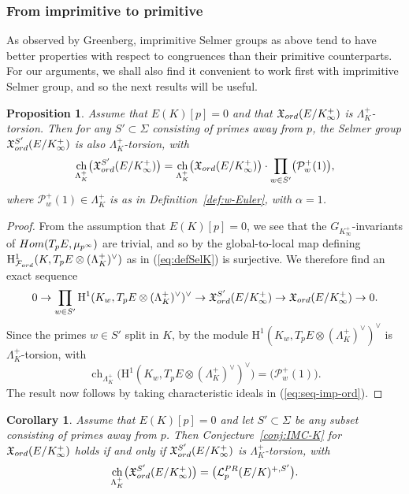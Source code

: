 \documentclass[a4paper,10pt]{amsart}
\numberwithin{equation}{section}
\numberwithin{equation}{section}
\theoremstyle{plain}
\theoremstyle{definition}
\theoremstyle{definition}
\theoremstyle{plain}
\newtheorem{prop}[thm]{Proposition}
\theoremstyle{plain}
\theoremstyle{plain}
\newtheorem{cor}[thm]{Corollary}
\theoremstyle{plain}
\newcommand{\X}{\mathfrak{X}}
\DeclareMathOperator{\ch}{ch}
\newcommand{\Lcal}{\mathcal{L}}
\newcommand{\Fcal}{\mathcal{F}}
\newcommand{\rH}{\mathrm{H}}
\begin{document}
\subsubsection{From imprimitive to primitive}

As observed by Greenberg, imprimitive Selmer groups as above tend to have better properties with respect to congruences than their primitive counterparts. For our arguments, we shall also find it convenient to work first with imprimitive Selmer group, and so the next results will be useful.


\begin{prop}\label{prop:prim-imprim-ord}
Assume that $E(K)[p]=0$ and that $\X_{\rm ord}(E/K_\infty^+)$ is $\Lambda_K^+$-torsion. Then for any $S'\subset\Sigma$ consisting of primes away from $p$, the Selmer group $\X_{\rm ord}^{S'}(E/K_\infty^+)$ is also $\Lambda_K^+$-torsion, with
\[
\ch_{\Lambda_K^+}\bigl(\X_{\rm ord}^{S'}(E/K_\infty^+)\bigr)=
\ch_{\Lambda_K^+}\bigl(\X_{\rm ord}(E/K_\infty^+)\bigr)\cdot\prod_{w\in S'}\bigl(\mathcal{P}_w^+(1)\bigr),
\]
where $\mathcal{P}_w^+(1)\in\Lambda_K^+$ is as in Definition~\ref{def:w-Euler}, with $\alpha=1$.
\end{prop}

\begin{proof}
From the assumption that $E(K)[p]=0$, we see that the $G_{K_\infty^+}$-invariants of ${\rm Hom}(T_pE,\mu_{p^\infty})$ are trivial, and so by \cite[Prop.~A.2]{pollack2011anticyclotomic} the global-to-local map defining $\rH^1_{\Fcal_{\rm ord}}(K,T_pE\otimes(\Lambda_K^+)^\vee)$ as in (\ref{eq:defSelK}) is surjective. We therefore find an exact sequence
\begin{equation}\label{eq:seq-imp-ord}
0\to\prod_{w\in S'}\rH^1(K_w,T_pE\otimes(\Lambda_K^+)^\vee)^\vee\to\X_{\rm ord}^{S'}(E/K_\infty^+)\to\X_{\rm ord}(E/K_\infty^+)\to 0.
\end{equation}
Since the primes $w\in S'$ split in $K$, by  \cite[Prop.~2.4]{greenvats} the module $\rH^1(K_w,T_pE\otimes(\Lambda_K^+)^\vee)^\vee$ is $\Lambda_K^+$-torsion, with
\[
\ch_{\Lambda_K^+}\bigl(\rH^1(K_w,T_pE\otimes(\Lambda_K^+)^\vee)^\vee\bigr)=\bigl(\mathcal{P}_w^+(1)\bigr).
\]
The result now follows by taking characteristic ideals in (\ref{eq:seq-imp-ord}).
\end{proof}




\begin{cor}\label{cor:imp-IMC} 
Assume that $E(K)[p]=0$ and let $S'\subset\Sigma$ be any subset consisting of primes away from $p$. Then Conjecture~\ref{conj:IMC-K} for $\mathfrak{X}_{\rm ord}(E/K_\infty^+)$ holds if and only if $\mathfrak{X}_{\rm ord}^{S'}(E/K_\infty^+)$ is $\Lambda_K^+$-torsion, with
\[
\ch_{\Lambda_K^+}\bigl(\X_{\rm ord}^{S'}(E/K_{\infty}^+)\bigr)=\bigl(\Lcal_p^{\rm PR}(E/K)^{+,S'}\bigr).
\]
\end{cor}
\end{document}
